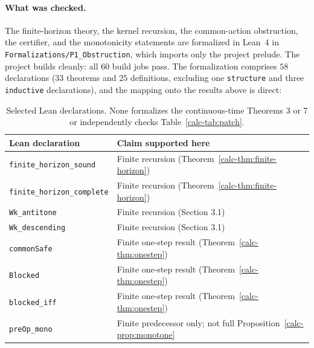 \documentclass[10pt,twocolumn]{article}
\theoremstyle{definition}
\begin{document}
\paragraph{What was checked.} The finite-horizon theory, the kernel recursion, the
common-action obstruction, the certifier, and the monotonicity statements are formalized in Lean~4 in \texttt{Formalizations/P1\_Obstruction}, which imports only the
project prelude. The project builds cleanly: all \(60\) build jobs pass. The formalization comprises \(58\) declarations (\(33\) theorems and \(25\) definitions, excluding one \texttt{structure} and three \texttt{inductive} declarations), and the mapping onto the results above is
direct:

\begin{table}[tbp]
\centering
\scriptsize
\setlength{\tabcolsep}{2pt}
\begin{tabular}{@{}>{\raggedright\arraybackslash}p{}>{\raggedright\arraybackslash}p{}@{}}
\toprule
Lean declaration & Claim supported here\\
\midrule
\texttt{finite\_horizon\_sound} & Finite recursion (Theorem~\ref{calc-thm:finite-horizon})\\
\texttt{finite\_horizon\_complete} & Finite recursion (Theorem~\ref{calc-thm:finite-horizon})\\
\texttt{Wk\_antitone} & Finite recursion (Section 3.1)\\
\texttt{Wk\_descending} & Finite recursion (Section 3.1)\\
\texttt{commonSafe} & Finite one-step result (Theorem~\ref{calc-thm:onestep})\\
\texttt{Blocked} & Finite one-step result (Theorem~\ref{calc-thm:onestep})\\
\texttt{blocked\_iff} & Finite one-step result (Theorem~\ref{calc-thm:onestep})\\
\texttt{preOp\_mono} & Finite predecessor only; not full Proposition~\ref{calc-prop:monotone}\\
\bottomrule
\end{tabular}
\caption{Selected Lean declarations. None formalizes the continuous-time Theorems 3 or 7 or independently checks Table~\ref{calc-tab:patch}.}
\label{calc-tab:lean-scope}
\end{table}
\end{document}
